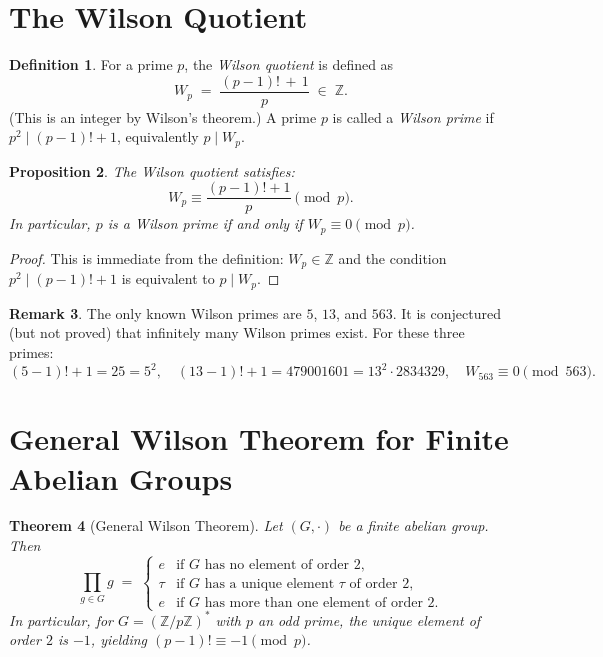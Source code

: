 \documentclass[12pt,a4paper]{amsart}
\newtheorem{theorem}{Theorem}[section]
\newtheorem{proposition}[theorem]{Proposition}
\theoremstyle{definition}
\newtheorem{definition}[theorem]{Definition}
\newtheorem{remark}[theorem]{Remark}
\newcommand{\Z}{\mathbb{Z}}
\begin{document}
\section{The Wilson Quotient}

\begin{definition}\label{def:wilson_quotient}
  For a prime $p$, the \emph{Wilson quotient} is defined as
  \[
    W_p \;=\; \frac{(p-1)!\,+\,1}{p} \;\in\; \Z.
  \]
  (This is an integer by Wilson's theorem.)
  A prime $p$ is called a \emph{Wilson prime} if $p^2 \mid (p-1)! + 1$,
  equivalently $p \mid W_p$.
\end{definition}

\begin{proposition}\label{prop:wilson_quotient_basic}
  The Wilson quotient satisfies:
  \[
    W_p \equiv \frac{(p-1)!+1}{p} \pmod p.
  \]
  In particular, $p$ is a Wilson prime if and only if $W_p \equiv 0 \pmod p$.
\end{proposition}

\begin{proof}
  This is immediate from the definition: $W_p \in \Z$ and the condition
  $p^2 \mid (p-1)!+1$ is equivalent to $p \mid W_p$.
\end{proof}

\begin{remark}
  The only known Wilson primes are $5$, $13$, and $563$.
  It is conjectured (but not proved) that infinitely many Wilson primes exist.
  For these three primes:
  \[
    (5-1)! + 1 = 25 = 5^2, \quad
    (13-1)! + 1 = 479001601 = 13^2 \cdot 2834329, \quad
    W_{563} \equiv 0 \pmod{563}.
  \]
\end{remark}

\section{General Wilson Theorem for Finite Abelian Groups}\label{sec:general_wilson}

\begin{theorem}[General Wilson Theorem]\label{thm:general_wilson}
  Let $(G, \cdot)$ be a finite abelian group.  Then
  \[
    \prod_{g \in G} g
    \;=\;
    \begin{cases}
      e        & \text{if } G \text{ has no element of order } 2, \\
      \tau      & \text{if } G \text{ has a unique element } \tau \text{ of order } 2, \\
      e        & \text{if } G \text{ has more than one element of order } 2.
    \end{cases}
  \]
  In particular, for $G = (\Z/p\Z)^*$ with $p$ an odd prime, the unique
  element of order $2$ is $-1$, yielding $(p-1)! \equiv -1 \pmod p$.
\end{theorem}
\end{document}
